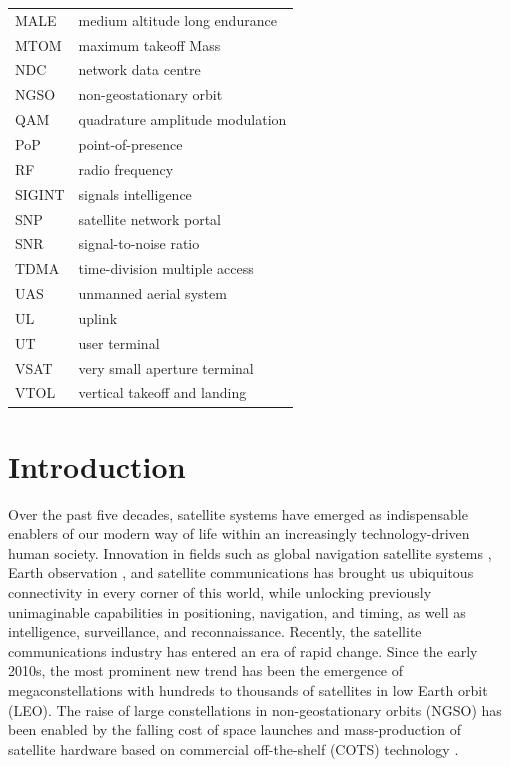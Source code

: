 \documentclass[english, 12pt, a4paper, elec, utf8, a-1b, online]{aaltothesis}
\begin{document}
\begin{tabular}{ll}
MALE                    & medium altitude long endurance \\
MTOM                    & maximum takeoff Mass \\
NDC                     & network data centre \\
NGSO                    & non-geostationary orbit \\
QAM                     & quadrature amplitude modulation \\
PoP                     & point-of-presence \\
RF                      & radio frequency \\
SIGINT                  & signals intelligence \\
SNP                     & satellite network portal \\
SNR                     & signal-to-noise ratio \\
TDMA                    & time-division multiple access \\
UAS                     & unmanned aerial system \\
UL                      & uplink \\
UT                      & user terminal \\
VSAT                    & very small aperture terminal \\
VTOL                    & vertical takeoff and landing
\end{tabular}

\cleardoublepage

\section{Introduction}

Over the past five decades, satellite systems have emerged as indispensable enablers of our modern way of life within an increasingly technology-driven human society.
Innovation in fields such as global navigation satellite systems \cite{oconnor2019economic}, Earth observation \cite{lupi2022socioeconomic, tassa2020socioeconomic}, and satellite communications \cite{euspa-secure-satcom-2023, euroconsult-space-economy-2023} has brought us ubiquitous connectivity in every corner of this world, while unlocking previously unimaginable capabilities in positioning, navigation, and timing, as well as intelligence, surveillance, and reconnaissance.
Recently, the satellite communications industry has entered an era of rapid change.
Since the early 2010s, the most prominent new trend has been the emergence of megaconstellations with hundreds to thousands of satellites in low Earth orbit (LEO).
The raise of large constellations in non-geostationary orbits (NGSO) has been enabled by the falling cost of space launches and mass-production of satellite hardware based on commercial off-the-shelf (COTS) technology \cite{euroconsult-space-economy-2023}.
\end{document}
